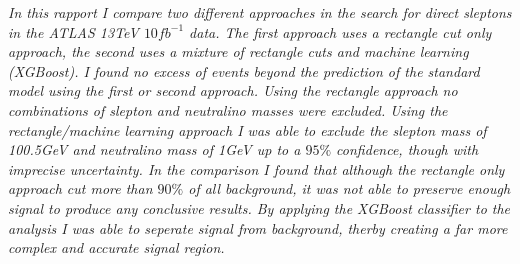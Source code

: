 \documentclass{article}
\begin{document}
\begin{center}
\centering
\textit{
In this rapport I compare two different approaches in the search for direct sleptons in the ATLAS 13TeV $10fb^{-1}$ data. The first approach uses a rectangle cut only approach, the second uses a mixture of rectangle cuts and machine learning (XGBoost). I found no excess of events beyond the prediction of the standard model using the first or second approach. Using the rectangle approach no combinations of slepton and neutralino masses were excluded. Using the rectangle/machine learning approach I was able to exclude the slepton mass of 100.5GeV and neutralino mass of 1GeV up to a $95\%$ confidence, though with imprecise uncertainty. In the comparison I found that although the rectangle only approach cut more than $90\%$ of all background, it was not able to preserve enough signal to produce any conclusive results. By applying the XGBoost classifier to the analysis I was able to seperate signal from background, therby creating a far more complex and accurate signal region. 
}
\end{center}
\end{document}
